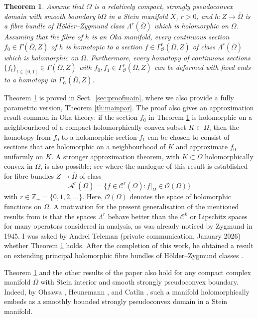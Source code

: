 \documentclass[11pt]{amsart}
\numberwithin{equation}{section}
\newtheorem{theorem}{Theorem}[section]
\theoremstyle{definition}
\newcommand\Ascr{\mathscr{A}}
\newcommand\Cscr{\mathscr{C}}
\newcommand\Oscr{\mathscr{O}}
\newcommand\Z{\mathbb{Z}}
\begin{document}
%
%
\begin{theorem}\label{th:main}
Assume that $\Omega$ is a relatively compact, strongly pseudoconvex 
domain with smooth boundary $b\Omega$ in a Stein manifold $X$, $r>0$, 
and $h:Z\to \overline \Omega$ is a fibre bundle of H\"older--Zygmund 
class $\Lambda^r(\overline \Omega)$ which is holomorphic on $\Omega$.
Assuming that the fibre of $h$ is an Oka manifold, every continuous
section $f_0\in \Gamma(\overline \Omega,Z)$ of $h$ is homotopic to a section 
$f\in \Gamma^r_\Oscr(\overline \Omega,Z)$ of class 
$\Lambda^r(\overline \Omega)$ which is holomorphic on $\Omega$. 
Furthermore, every homotopy of continuous sections 
$\{f_t\}_{t\in [0,1]}\in \Gamma(\overline \Omega,Z)$ with 
$f_0, f_1 \in \Gamma^r_\Oscr(\overline \Omega,Z)$ can be deformed with
fixed ends to a homotopy in $\Gamma^r_\Oscr(\overline \Omega,Z)$. 
\end{theorem}

Theorem \ref{th:main} is proved in Sect.\ \ref{sec:proofmain}, where we
also provide a fully parametric version, Theorem \ref{th:mainpar}.
The proof also gives an approximation result common in Oka 
theory: if the section $f_0$ in Theorem \ref{th:main} is holomorphic
on a neighbourhood of a compact holomorphically convex subset
$K\subset \Omega$, then the homotopy from $f_0$ to a holomorphic
section $f_1$ can be chosen to consist of sections that are holomorphic
on a neighbourhood of $K$ and approximate $f_0$ uniformly on $K$.
A stronger approximation theorem, with $K\subset\overline \Omega$
holomorphically convex in $\overline \Omega$, is also possible;
see \cite[Theorem 6.1]{DrinovecForstneric2008FM} where the
analogue of this result is established for fibre bundles 
$Z\to \overline \Omega$ of class 
\[
	\Ascr^r(\overline\Omega)
	=\{f\in \Cscr^r(\overline \Omega):f|_\Omega \in\Oscr(\Omega)\}
\]
with $r\in \Z_+=\{0,1,2,\ldots\}$. Here, $\Oscr(\Omega)$ denotes the space
of holomorphic functions on $\Omega$.
A motivation for the present generalisation of the mentioned results
from \cite{DrinovecForstneric2008FM}  is that the spaces $\Lambda^r$ 
behave better than the $\Cscr^k$ or Lipschitz spaces for many  
operators considered in analysis, as was already noticed by Zygmund in 1945. 
I was asked by Andrei Teleman (private communication, January 2026) 
whether Theorem \ref{th:main} holds.
After the completion of this work, he obtained a result
on extending principal holomorphic fibre bundles of 
H\"older--Zygmund classes \cite{Teleman2026}.

Theorem \ref{th:main} and the other results of the 
paper also hold for any compact complex manifold 
$\overline \Omega$ with Stein interior and smooth 
strongly pseudoconvex boundary. Indeed, by 
Ohsawa \cite{Ohsawa1984LNM}, Heunemann \cite{Heunemann1986III}, 
and Catlin \cite{Catlin1988}, such a manifold 
holomorphically embeds as a smoothly bounded strongly 
pseudoconvex domain in a Stein manifold.
\end{document}
